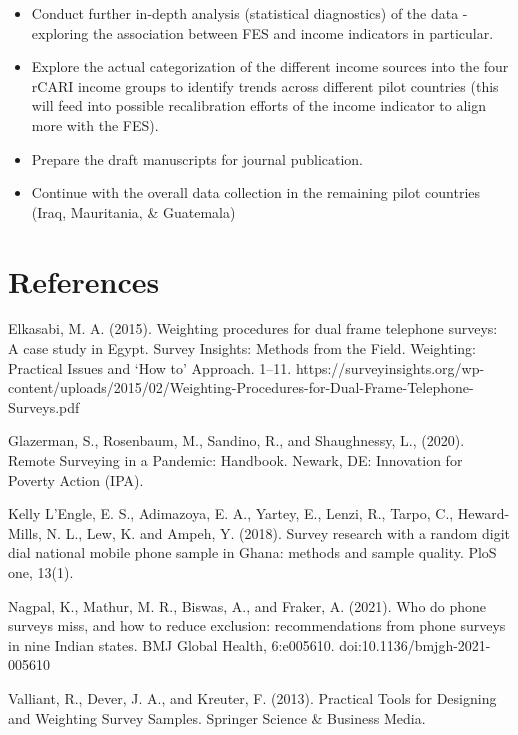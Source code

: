 \documentclass[11pt,harvard]{article}
\begin{document}
	\begin{itemize}[label=--, left=2.5em]
		\item[1.] Conduct further in-depth analysis (statistical diagnostics)  of the data - exploring the association between FES and income indicators in particular.
		\item[2.] Explore the actual categorization of the different income sources into the four rCARI income groups to identify trends across different pilot countries (this will feed into possible recalibration efforts of the income indicator to align more with the FES).
		\item[3.] Prepare the draft manuscripts for  journal publication.	
		\item[4.] Continue with the overall data collection in the remaining pilot countries (Iraq, Mauritania, \& Guatemala)
	\end{itemize} 
	
	
	\pagebreak
	
	
	\section{References}
	
	Elkasabi, M. A. (2015). Weighting procedures for dual frame telephone surveys: A case study in Egypt. Survey Insights: Methods from the Field. Weighting: Practical Issues and ‘How to’ Approach. 1–11. https://surveyinsights.org/wp-content/uploads/2015/02/Weighting-Procedures-for-Dual-Frame-Telephone-Surveys.pdf
	
	Glazerman, S., Rosenbaum, M., Sandino, R., and Shaughnessy, L., (2020). Remote Surveying in a Pandemic: Handbook. Newark, DE: Innovation for Poverty Action (IPA).
	
	Kelly L’Engle, E. S., Adimazoya, E. A., Yartey, E., Lenzi, R., Tarpo, C., Heward-Mills, N. L., Lew, K. and Ampeh, Y. (2018). Survey research with a random digit dial national mobile phone sample in Ghana: methods and sample quality. PloS one, 13(1).
	
	Nagpal, K., Mathur, M. R., Biswas, A., and Fraker, A. (2021). Who do phone surveys miss, and how to reduce exclusion: recommendations from phone surveys in nine Indian states. BMJ Global Health, 6:e005610. doi:10.1136/bmjgh-2021-005610
	
	Valliant, R., Dever, J. A., and Kreuter, F. (2013). Practical Tools for Designing and Weighting Survey Samples. Springer Science \& Business Media.
	
\end{document}
